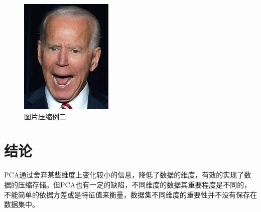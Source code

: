 \documentclass[withoutpreface,bwprint]{cumcmthesis}
\begin{document}
\begin{figure}[H]
    \centering
    \includegraphics[width=\textwidth]{biden}
    \caption{图片压缩例二}
    \label{图5}
\end{figure}
\section{结论}
PCA通过舍弃某些维度上变化较小的信息，降低了数据的维度，有效的实现了数据的压缩存储。但PCA也有一定的缺陷，不同维度的数据其重要程度是不同的，不能简单的依据方差或是特征值来衡量，数据集不同维度的重要性并不没有保存在数据集中。
\end{document}
